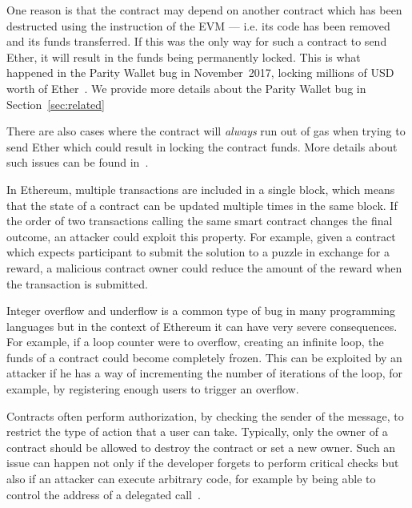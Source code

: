 One reason is that the contract may depend on another contract which has been
destructed using the  instruction of the EVM --- i.e. its code has been removed and its funds transferred. If this was the only way for such a contract to send Ether, it will result in the funds being permanently locked. This is what happened in the Parity Wallet bug in November~2017, locking millions of USD worth of Ether~\cite{Breidenbach}. We provide more details about the Parity Wallet bug in Section~\ref{sec:related}

There are also cases where the contract will \emph{always} run out of gas when trying
to send Ether which could result in locking the contract funds. More details about such issues can be found in~\cite{Grech2018}.

\point{\transactionorder~(\vto)}
In Ethereum, multiple transactions are included in a single block, which means that the state of a contract can be updated multiple times in the same block. If the order of two transactions calling the same smart contract changes the final outcome, an attacker could exploit this property. For example, given a contract which expects participant to submit the solution to a puzzle in exchange for a reward, a malicious contract owner could reduce the amount of the reward when the transaction is submitted.

\point{\integeroverflow~(\vio)}
Integer overflow and underflow is a common type of bug in many programming languages but in the context of Ethereum it can have very severe consequences. For example, if a loop counter were to overflow, creating an infinite loop, the funds of a contract could become completely frozen. This can be exploited by an attacker if he has a way of incrementing the number of iterations of the loop, for example, by registering enough users to trigger an overflow.

\point{\unrestrictedaction~(\vua)}
Contracts often perform authorization, by checking the sender of the message, to restrict the type of action that a user can take.
Typically, only the owner of a contract should be allowed to destroy the contract or set a new owner.
Such an issue can happen not only if the developer forgets to perform critical checks but also if an attacker can execute arbitrary code, for example by being able to control the address of a delegated call~\cite{Krupp2018}.


